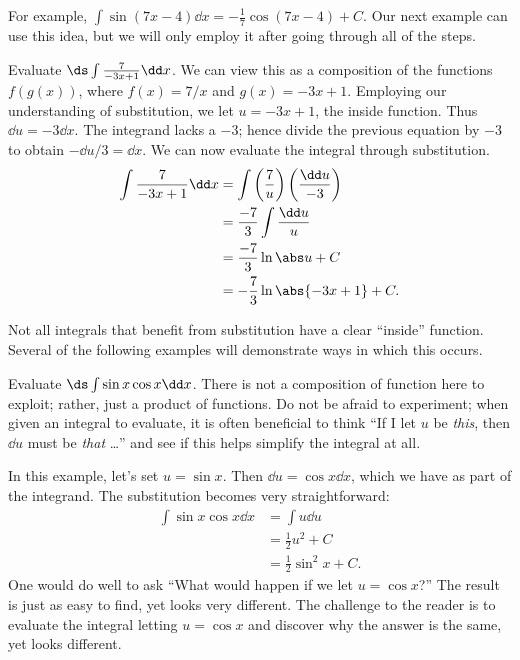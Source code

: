 For example, $\int \sin (7x-4)\dd x = -\frac17\cos(7x-4)+C$. Our next example can use this idea, but we will only employ it after going through all of the steps.

\begin{example}\label{ex_sub3}
Evaluate $\ds \int \frac{7}{-3x+1}\dd x$.
\solution
We can view this as a composition of the functions $f(g(x))$, where $f(x) = 7/x$ and $g(x) = -3x+1$. Employing our understanding of substitution, we let $u = -3x+1$, the inside function. Thus $\dd u = -3\dd x$. The integrand lacks a $-3$; hence divide the previous equation by $-3$ to obtain $-\dd u/3 = \dd x$. We can now evaluate the integral through substitution.
\begin{align*}
	\int \frac{7}{-3x+1}\dd x
	&= \int\left(\frac{7}{u}\right)\left(\frac{\dd u}{-3}\right) \\
	&= \frac{-7}3\int \frac{\dd u}{u} \\
	&= \frac{-7}3\ln \abs u + C\\
	&= -\frac73\ln\abs{-3x+1} + C.
\end{align*}
\end{example}

Not all integrals that benefit from substitution have a clear ``inside'' function. Several of the following examples will demonstrate ways in which this occurs.

\begin{example}\label{ex_sub10}
Evaluate $\ds \int \sin x\cos x\dd x$.
\solution
There is not a composition of function here to exploit; rather, just a product of functions. Do not be afraid to experiment; when given an integral to evaluate, it is often beneficial to think ``If I let $u$ be \emph{this}, then $\dd u$ must be \emph{that} \ldots'' and see if this helps simplify the integral at all.

In this example, let's set $u = \sin x$. Then $\dd u = \cos x\dd x$, which we have as part of the integrand. The substitution becomes very straightforward:
\begin{align*}
	\int \sin x\cos x\dd x
	&=	\int u\dd u \\
	&= \frac12u^2+ C \\
	&= \frac12\sin^2 x + C.
\end{align*}
One would do well to ask ``What would happen if we let $u = \cos x$?'' The result is just as easy to find, yet looks very different. The challenge to the reader is to evaluate the integral letting $u = \cos x$ and discover why the answer is the same, yet looks different.
\end{example}

